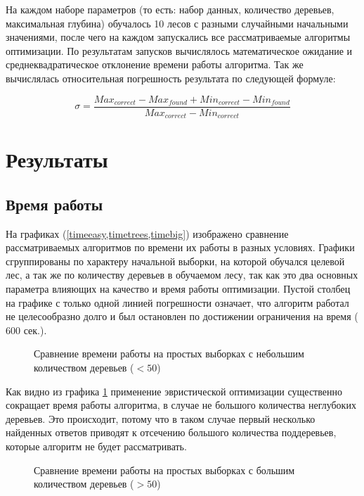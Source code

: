 На каждом наборе параметров (то есть: набор данных, количество деревьев,
максимальная глубина) обучалось 10 лесов с разными случайными начальными
значениями, после чего на каждом запускались все рассматриваемые алгоритмы
оптимизации. По результатам запусков вычислялось математическое ожидание
и среднеквадратическое отклонение времени работы алгоритма. Так же вычислялась
относительная погрешность результата по следующей формуле:

\[
    \sigma = \frac{Max_{correct} - Max_{found} + Min_{correct} - Min_{found}}
    {Max_{correct} - Min_{correct}}
\]

\section{Результаты}\label{sec:results}

\subsection{Время работы}

На графиках (\cref{timeeasy,timetrees,timebig}) изображено сравнение
рассматриваемых алгоритмов по времени их работы в разных условиях. Графики
сгруппированы по характеру начальной выборки, на которой обучался целевой лес,
а так же по количеству деревьев в обучаемом лесу, так как это два основных
параметра влияющих на качество и время работы оптимизации. Пустой столбец на
графике с только одной линией погрешности означает, что алгоритм работал не
целесообразно долго и был остановлен по достижении ограничения на время ($600$
сек.).

\begin{figure}[H]
    \caption{Сравнение времени работы на простых выборках с небольшим
    количеством деревьев ($<50$)}\label{timeeasy}
\end{figure}

Как видно из графика \cref{timeeasy} применение эвристической оптимизации
существенно сокращает время работы алгоритма, в случае не большого количества
неглубоких деревьев. Это происходит, потому что в таком случае первый несколько
найденных ответов приводят к отсечению большого количества поддеревьев, которые
алгоритм не будет рассматривать.

\begin{figure}[H]
    \caption{Сравнение времени работы на простых выборках с большим количеством
    деревьев ($>50$)}\label{timetrees}
\end{figure}

